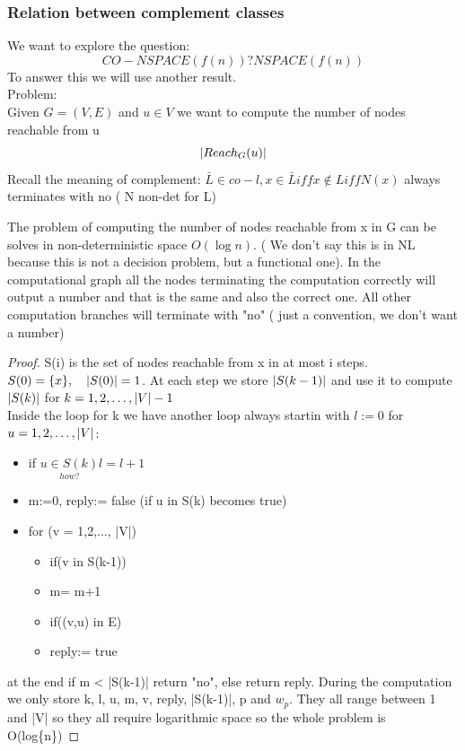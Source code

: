 \subsubsection*{Relation between complement classes}
We want to explore the question:
\[ 
    CO-NSPACE(f(n)) ? NSPACE(f(n)) 
\]
To answer this we will use another result.\\
Problem:\\
Given $ G=(V,E) $ and $u \in V$ we want to compute the number of nodes reachable from u
\[ 
    \left\lvert Reach_G(u)\right\rvert 
\]
Recall the meaning of complement: $\bar{L} \in co-l, x \in \bar{L} iff x\notin L iff N(x)$ always terminates with no ( N non-det for L)
\begin{theorem}
    The problem of computing the number of nodes reachable from x in G can be solves in non-deterministic space $O(\log{n})$. ( We don't say this is in NL because this is not a decision problem, but a functional one). In the computational graph all the nodes terminating the computation correctly will output a number and that is the same and also the correct one. All other computation branches will terminate with "no" ( just a convention, we don't want a number)
    \begin{proof}
        S(i) is the set of nodes reachable from x in at most i steps.\\
       $ S(0) = \{x\}, \quad \left\lvert S(0)\right\rvert=1$. At each step we store $\left\lvert S(k-1)\right\rvert$ and use it to compute $\left\lvert S(k)\right\rvert$ for $k = 1,2,\ldots, \left\lvert V\right\rvert-1$\\
       Inside the loop for k we have another loop always startin with $l:=0$ for $u = 1,2, \ldots, \left\lvert V\right\rvert$:
       \begin{itemize}
        \item if $\underset{how?}{u \in S(k)} l=l+1$
        \item m:=0, reply:= false (if u in S(k) becomes true)
        \item for (v = 1,2,..., |V|) \begin{itemize}
            \item if(v in S(k-1))
            \item   m= m+1
            \item   if((v,u) in E)
            \item       reply:= true
        \end{itemize}
       \end{itemize}
       at the end if m < |S(k-1)| return "no", else return reply. During the computation we only store k, l, u, m, v, reply, |S(k-1)|, p and $w_p$. They all range between 1 and |V| so they all require logarithmic space so the whole problem is O(log\{n\})
    \end{proof}
\end{theorem}
